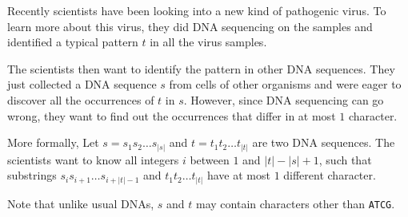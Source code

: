 Recently scientists have been looking into a new kind of pathogenic virus.
To learn more about this virus, they did DNA sequencing on the samples and identified a typical pattern $t$ in all the virus samples.

The scientists then want to identify the pattern in other DNA sequences.
They just collected a DNA sequence $s$ from cells of other organisms and were eager to discover all the occurrences of $t$ in $s$.
However, since DNA sequencing can go wrong, they want to find out the occurrences that differ in at most $1$ character.

More formally, Let $s=s_1s_2\ldots s_{|s|}$ and $t = t_1t_2\ldots t_{|t|}$ are two DNA sequences.
The scientists want to know all integers $i$ between $1$ and $|t|-|s|+1$, such that substrings $s_is_{i+1}\ldots s_{i+|t|-1}$ and $t_1t_2\ldots t_{|t|}$ have at most $1$ different character.

Note that unlike usual DNAs, $s$ and $t$ may contain characters other than \texttt{ATCG}.